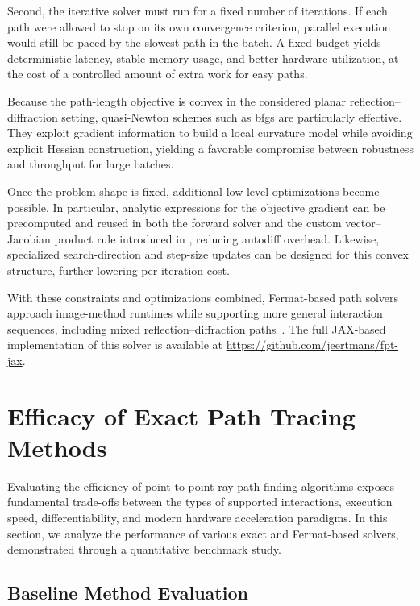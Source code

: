 Second, the iterative solver must run for a fixed number of iterations. If each path were allowed to stop on its own convergence criterion, parallel execution would still be paced by the slowest path in the batch. A fixed budget yields deterministic latency, stable memory usage, and better hardware utilization, at the cost of a controlled amount of extra work for easy paths.

Because the path-length objective is convex in the considered planar reflection--diffraction setting, quasi-Newton schemes such as \gls{bfgs} are particularly effective. They exploit gradient information to build a local curvature model while avoiding explicit Hessian construction, yielding a favorable compromise between robustness and throughput for large batches.

Once the problem shape is fixed, additional low-level optimizations become possible. In particular, analytic expressions for the objective gradient can be precomputed and reused in both the forward solver and the custom vector--Jacobian product rule introduced in , reducing autodiff overhead. Likewise, specialized search-direction and step-size updates can be designed for this convex structure, further lowering per-iteration cost.

With these constraints and optimizations combined, Fermat-based path solvers approach image-method runtimes while supporting more general interaction sequences, including mixed reflection--diffraction paths~. The full JAX-based implementation of this solver is available at \url{https://github.com/jeertmans/fpt-jax}.

\section{Efficacy of Exact Path Tracing Methods}

Evaluating the efficiency of point-to-point ray path-finding algorithms exposes fundamental trade-offs between the types of supported interactions, execution speed, differentiability, and modern hardware acceleration paradigms. In this section, we analyze the performance of various exact and Fermat-based solvers, demonstrated through a quantitative benchmark study.

\subsection{Baseline Method Evaluation}

